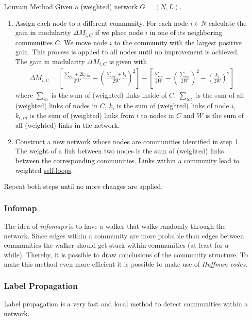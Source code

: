 \documentclass[english]{panikzettel}
\begin{document}
\begin{algo}{Louvain Method}
Given a (weighted) network $ G = (N,L) $.

\begin{enumerate}
	\item Assign each node to a different community.
	For each node $ i \in N $ calculate the gain in modularity $ \Delta M_{i,C} $ if we place node $ i $ in one of its neighboring communities $ C $.
	We move node $ i $ to the community with the largest positive gain.
	This process is applied to all nodes until no improvement is achieved.
	The gain in modularity $ \Delta M_{i,C} $ is given with
	\begin{align*}
		\Delta M_{i,C} = \left[\frac{\sum_{in} + 2 k _{i,in}}{2W} - \left(\frac{\sum_{tot} + k_i}{2W}\right)^2\right] - \left[\frac{\sum_{in}}{2W} - \left(\frac{\sum_{tot}}{2W}\right)^2 - \left(\frac{k_i}{2W}\right)^2\right]
	\end{align*}
	where $ \sum_{in} $ is the sum of (weighted) links inside of $ C $, $ \sum_{tot} $ is the sum of all (weighted) links of nodes in $ C $, $ k_i $ is the sum of (weighted) links of node $ i $, $ k_{i,in} $ is the sum of (weighted) links from $ i $ to nodes in $ C $ and $ W $ is the sum of all (weighted) links in the network.
	\item Construct a new network whose nodes are communities identified in step 1.
	The weight of a link between two nodes is the sum of (weighted) links between the corresponding communities.
	Links within a community lead to weighted \hyperref[sec:graph_basics]{self-loops}.
\end{enumerate}

Repeat both steps until no more changes are applied.
\end{algo}

\subsubsection{Infomap}
The idea of \emph{infomaps} is to have a walker that walks randomly through the network.
Since edges within a community are more probable than edges between communities the walker should get stuck within communities (at least for a while).
Thereby, it is possible to draw conclusions of the community structure.
To make this method even more efficient it is possible to make use of \textit{Huffman codes}.

\subsubsection{Label Propagation}
Label propagation is a very fast and local method to detect communities within a network.
\end{document}
